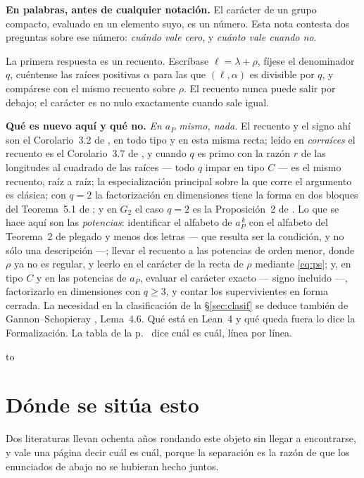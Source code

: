 \documentclass[11pt,a4paper]{article}
\newenvironment{keybox}
  {\par\vspace{9pt}\begin{lrbox}{\fichabox}%
   \begin{minipage}{0.90\textwidth}\vspace{7pt}\setlength{\parskip}{3pt}}
  {\vspace{7pt}\end{minipage}\end{lrbox}%
   \par\noindent\hbox to \textwidth{\hfill
   \textcolor{azul}{\rule[-\dp\fichabox]{3.2pt}{\dimexpr\ht\fichabox+\dp\fichabox\relax}}%
   \colorbox{fondoficha}{\usebox{\fichabox}}\hfill}%
   \par\vspace{9pt}}
\begin{document}
\begin{keybox}
\textbf{En palabras, antes de cualquier notación.} El carácter de un grupo compacto, evaluado en un
elemento suyo, es un número. Esta nota contesta dos preguntas sobre ese número: \emph{cuándo vale
cero}, y \emph{cuánto vale cuando no}.

\smallskip
La primera respuesta es un recuento. Escríbase $\ell=\lambda+\rho$, fíjese el denominador $q$, cuéntense
las raíces positivas $\alpha$ para las que $(\ell,\alpha)$ es divisible por $q$, y compárese con el
mismo recuento sobre $\rho$. El recuento nunca puede salir por debajo; el carácter es no nulo
exactamente cuando sale igual.

\smallskip
\textbf{Qué es nuevo aquí y qué no.} \emph{En $a_P$ mismo, nada.} El recuento y el signo ahí son el
Corolario~3.2 de \cite{CMP06}, en todo tipo y en esta misma recta; leído en \emph{corraíces} el
recuento es el Corolario~3.7 de \cite{NPP25}, y cuando $q$ es primo con la razón $r$ de las
longitudes al cuadrado de las raíces --- todo $q$ impar en tipo $C$ --- es el mismo recuento, raíz
a raíz; la especialización principal sobre la que corre el argumento es clásica; con $q=2$ la
factorización en dimensiones tiene la forma en dos bloques del Teorema~5.1 de \cite{Kar24}; y en
$G_2$ el caso $q=2$ es la Proposición~2 de \cite{Kar24}. Lo que se hace aquí son las
\emph{potencias}: identificar el alfabeto de $a_P^{\,k}$ con el alfabeto del Teorema~2 de
\cite{Prasad16b} plegado y menos dos letras --- que resulta ser la condición, y no sólo una
descripción ---; llevar el recuento a las potencias de orden menor, donde $\rho$ ya no es regular,
y leerlo en el carácter de la recta de $\rho$ mediante \eqref{eq:ps}; y, en tipo $C$ y en las
potencias de $a_P$, evaluar el carácter exacto --- signo incluido ---, factorizarlo en dimensiones
con $q\ge3$, y contar los supervivientes en forma cerrada. La necesidad en la clasificación de la
\S\ref{sec:clasif} se deduce también de Gannon--Schopieray \cite{GS19}, Lema~4.6. Qué está en
Lean~4 y qué queda fuera lo dice la Formalización. La tabla de la p.~\pageref{tab:attrib} dice
cuál es cuál, línea por línea.
\end{keybox}

\section{Dónde se sitúa esto}\label{sec:map}

Dos literaturas llevan ochenta años rondando este objeto sin llegar a encontrarse, y vale una página
decir cuál es cuál, porque la separación es la razón de que los enunciados de abajo no se hubieran
hecho juntos.
\end{document}
